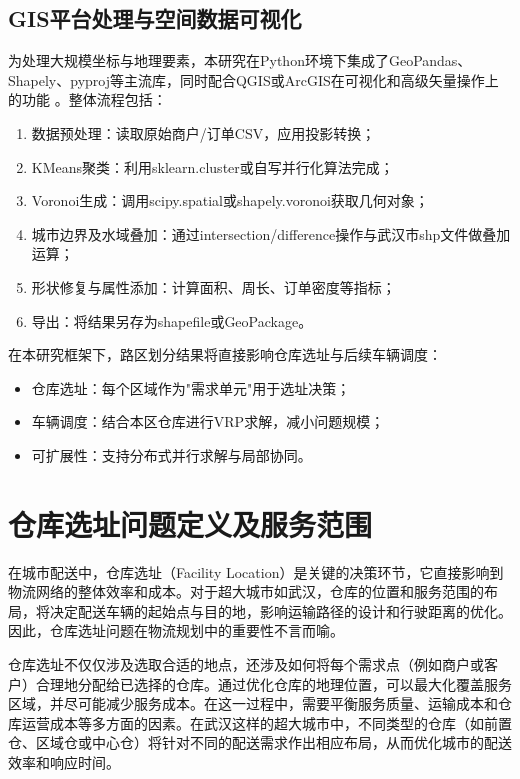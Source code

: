\documentclass[12pt,a4paper,twoside]{ctexbook}
\begin{document}
\subsection{GIS平台处理与空间数据可视化}

为处理大规模坐标与地理要素，本研究在Python环境下集成了GeoPandas、Shapely、pyproj等主流库，同时配合QGIS或ArcGIS在可视化和高级矢量操作上的功能 \cite{Rey2007}。整体流程包括：

\begin{enumerate}
    \item 数据预处理：读取原始商户/订单CSV，应用投影转换；
    \item KMeans聚类：利用sklearn.cluster或自写并行化算法完成；
    \item Voronoi生成：调用scipy.spatial或shapely.voronoi获取几何对象；
    \item 城市边界及水域叠加：通过intersection/difference操作与武汉市shp文件做叠加运算；
    \item 形状修复与属性添加：计算面积、周长、订单密度等指标；
    \item 导出：将结果另存为shapefile或GeoPackage。
\end{enumerate}

在本研究框架下，路区划分结果将直接影响仓库选址与后续车辆调度：
\begin{itemize}
    \item 仓库选址：每个区域作为"需求单元"用于选址决策；
    \item 车辆调度：结合本区仓库进行VRP求解，减小问题规模；
    \item 可扩展性：支持分布式并行求解与局部协同。
\end{itemize}

\section{仓库选址问题定义及服务范围}
在城市配送中，仓库选址（Facility Location）是关键的决策环节，它直接影响到物流网络的整体效率和成本。对于超大城市如武汉，仓库的位置和服务范围的布局，将决定配送车辆的起始点与目的地，影响运输路径的设计和行驶距离的优化。因此，仓库选址问题在物流规划中的重要性不言而喻。

仓库选址不仅仅涉及选取合适的地点，还涉及如何将每个需求点（例如商户或客户）合理地分配给已选择的仓库。通过优化仓库的地理位置，可以最大化覆盖服务区域，并尽可能减少服务成本。在这一过程中，需要平衡服务质量、运输成本和仓库运营成本等多方面的因素。在武汉这样的超大城市中，不同类型的仓库（如前置仓、区域仓或中心仓）将针对不同的配送需求作出相应布局，从而优化城市的配送效率和响应时间。
\end{document}
